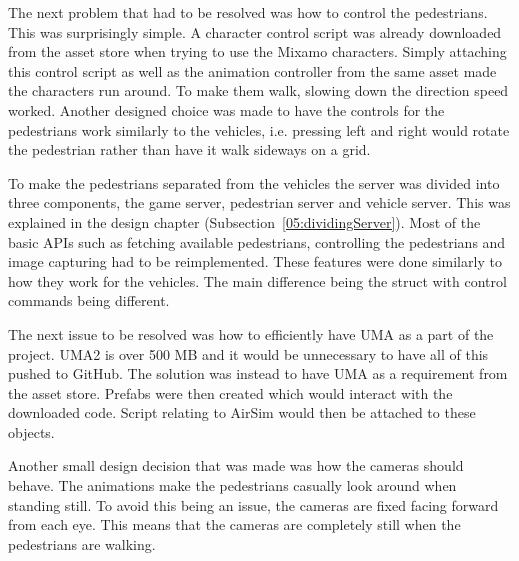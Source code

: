 The next problem that had to be resolved was how to control the pedestrians. This was surprisingly simple. A character control script was already downloaded from the asset store when trying to use the Mixamo characters. Simply attaching this control script as well as the animation controller from the same asset made the characters run around. To make them walk, slowing down the direction speed worked. Another designed choice was made to have the controls for the pedestrians work similarly to the vehicles, i.e. pressing left and right would rotate the pedestrian rather than have it walk sideways on a grid. 

To make the pedestrians separated from the vehicles the server was divided into three components, the game server, pedestrian server and vehicle server. This was explained in the design chapter (Subsection~\ref{05:dividingServer}). Most of the basic APIs such as fetching available pedestrians, controlling the pedestrians and image capturing had to be reimplemented. These features were done similarly to how they work for the vehicles. The main difference being the struct with control commands being different. 

The next issue to be resolved was how to efficiently have UMA as a part of the project. UMA2 is over 500 MB and it would be unnecessary to have all of this pushed to GitHub. The solution was instead to have UMA as a requirement from the asset store. Prefabs were then created which would interact with the downloaded code. Script relating to AirSim would then be attached to these objects. 

Another small design decision that was made was how the cameras should behave. The animations make the pedestrians casually look around when standing still. To avoid this being an issue, the cameras are fixed facing forward from each eye. This means that the cameras are completely still when the pedestrians are walking. 

